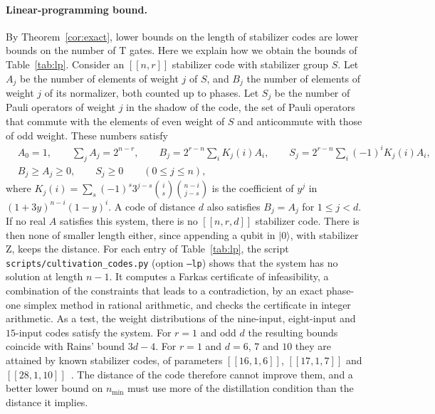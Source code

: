 \documentclass[aps,prl,reprint,twocolumn,amsmath,amssymb,floatfix,nofootinbib,superscriptaddress]{revtex4-2}
\theoremstyle{definition}
\theoremstyle{remark}
\begin{document}
\paragraph*{Linear-programming bound.}
By Theorem~\ref{cor:exact}, lower bounds on the length of stabilizer codes are lower bounds on the number of T gates. Here we explain how we obtain the bounds of Table~\ref{tab:lp}. Consider an $[[n,r]]$ stabilizer code with stabilizer group $S$. Let $A_j$ be the number of elements of weight $j$ of $S$, and $B_j$ the number of elements of weight $j$ of its normalizer, both counted up to phases. Let $S_j$ be the number of Pauli operators of weight $j$ in the shadow of the code, the set of Pauli operators that commute with the elements of even weight of $S$ and anticommute with those of odd weight. These numbers satisfy~\cite{shorlaflamme,rains}
\begin{align*}
&A_0=1,\qquad\textstyle\sum_jA_j=2^{n-r},\qquad B_j=2^{r-n}\sum_iK_j(i)A_i,\qquad S_j=2^{r-n}\sum_i(-1)^iK_j(i)A_i,\\
&B_j\geq A_j\geq0,\qquad S_j\geq0\qquad(0\leq j\leq n),
\end{align*}
where $K_j(i)=\sum_s(-1)^s3^{j-s}\binom is\binom{n-i}{j-s}$ is the coefficient of $y^j$ in $(1+3y)^{n-i}(1-y)^i$. A code of distance $d$ also satisfies $B_j=A_j$ for $1\leq j<d$. If no real $A$ satisfies this system, there is no $[[n,r,d]]$ stabilizer code. There is then none of smaller length either, since appending a qubit in $|0\rangle$, with stabilizer Z, keeps the distance. For each entry of Table~\ref{tab:lp}, the script \texttt{scripts/cultivation\_codes.py} (option \texttt{--lp}) shows that the system has no solution at length $n-1$. It computes a Farkas certificate of infeasibility, a combination of the constraints that leads to a contradiction, by an exact phase-one simplex method in rational arithmetic, and checks the certificate in integer arithmetic. As a test, the weight distributions of the nine-input, eight-input and $15$-input codes satisfy the system. For $r=1$ and odd $d$ the resulting bounds coincide with Rains' bound $3d-4$. For $r=1$ and $d=6$, $7$ and $10$ they are attained by known stabilizer codes, of parameters $[[16,1,6]]$, $[[17,1,7]]$ and $[[28,1,10]]$~\cite{grassl}. The distance of the code therefore cannot improve them, and a better lower bound on $n_{\min}$ must use more of the distillation condition than the distance it implies.
\end{document}
